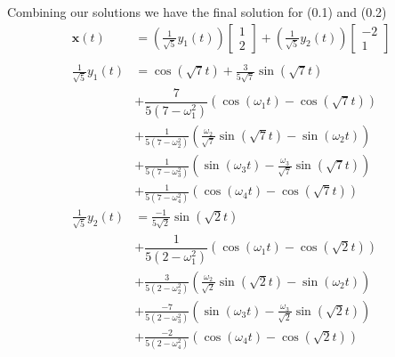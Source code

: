 \documentclass[12pt]{article}
\begin{document}
Combining our solutions we have the final solution for (0.1) and (0.2)
\begin{align*}
    \mathbf{x}(t)             & = (\frac{1}{\sqrt{5}} y_1(t)) \begin{bmatrix} 1 \\ 2 \end{bmatrix} + (\frac{1}{\sqrt{5}} y_2(t)) \begin{bmatrix} -2 \\ 1 \end{bmatrix} \\\\
    \frac{1}{\sqrt{5}} y_1(t) & = \cos(\sqrt{7}t) + \frac{3}{5\sqrt{7}}{\sin(\sqrt{7}t)}                                                                               \\
                              & + \dfrac{7}{5(7-\omega_1^2)}(\cos(\omega_{1}t) -\cos(\sqrt{7}t))                                                                       \\
                              & + \frac{1}{5(7-\omega_2^2)}(\frac{\omega_2}{\sqrt{7}}\sin(\sqrt{7}t) - \sin(\omega_{2}t))                                              \\
                              & + \frac{1}{5(7-\omega_3^2)}(\sin(\omega_{3}t) - \frac{\omega_3}{\sqrt{7}}\sin(\sqrt{7}t))                                              \\
                              & + \frac{1}{5(7-\omega_4^2)}(\cos(\omega_{4}t) - \cos(\sqrt{7}t))                                                                       \\
    \frac{1}{\sqrt{5}} y_2(t) & = \frac{-1}{5\sqrt{2}}\sin(\sqrt{2}t)                                                                                                  \\
                              & + \dfrac{1}{5(2-\omega_1^2)}(\cos(\omega_{1}t) -\cos(\sqrt{2}t))                                                                       \\
                              & +  \frac{3}{5(2-\omega_2^2)}(\frac{\omega_2}{\sqrt{2}}\sin(\sqrt{2}t) - \sin(\omega_{2}t))                                             \\
                              & +  \frac{-7}{5(2-\omega_3^2)}(\sin(\omega_{3}t) - \frac{\omega_3}{\sqrt{2}}\sin(\sqrt{2}t))                                            \\
                              & + \frac{-2}{5(2-\omega_4^2)}(\cos(\omega_{4}t) - \cos(\sqrt{2}t))
\end{align*}
\end{document}
